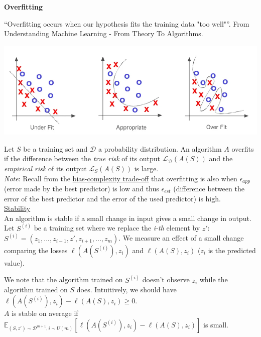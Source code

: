 {\fontsize{12pt}{22pt} \textbf{Overfitting}\par}

\vspace{5mm}

\newcommand{\quotes}[1]{``#1''}

\quotes{Overfitting occurs when our hypothesis fits the training data "too well"}. From Understanding Machine Learning - From Theory To Algorithms. \\

\begin{center}
\includegraphics[scale=0.4]{overfitting.png}
\end{center}

Let $S$ be a training set and $\mathcal{D}$ a probability distribution.
An algorithm $A$ overfits if the difference between the \textit{true risk} of its output $\mathcal{L}_{\mathcal{D}}(A(S))$ and the \textit{empirical risk} of its output $\mathcal{L}_S(A(S))$ is large. \\

\textit{Note}: Recall from the \hyperref[sec:bias-complexity-trade-off]{bias-complexity trade-off} that overfitting is also when $\epsilon_{app}$ (error made by the best predictor) is low and thus $\epsilon_{est}$ (difference between the error of the best predictor and the error of the used predictor) is high. \\

\underline{Stability} \\

An algorithm is stable if a small change in input gives a small change in output. \\

Let $S^{(i)}$ be a training set where we replace the \textit{i-th} element by $z'$: $S^{(i)}=(z_1,...,z_{i-1}, z', z_{i+1}, ... , z_m)$. We measure an effect of a small change comparing the losses $\ell(A(S^{(i)}),z_i)$ and $\ell(A(S),z_i)$ ($z_i$ is the predicted value). 

We note that the algorithm trained on $S^{(i)}$ doesn't observe $z_i$ while the algorithm trained on $S$ does. Intuitively, we should have $\ell(A(S^{(i)}),z_i) - \ell(A(S),z_i) \geq 0$. \\

$A$ is stable on average if $\mathbb{E}_{(S,z') \sim \mathcal{D}^{m+1}, i \sim U(m)}[\ell(A(S^{(i)}),z_i) - \ell(A(S),z_i)]$ is small.

\vspace{5mm}